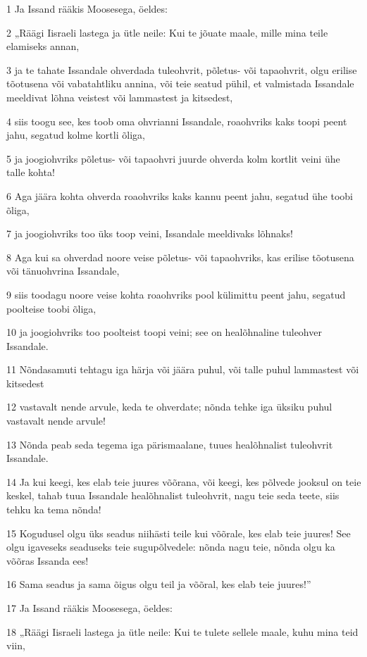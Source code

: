 \par 1 Ja Issand rääkis Moosesega, öeldes:
\par 2 „Räägi Iisraeli lastega ja ütle neile: Kui te jõuate maale, mille mina teile elamiseks annan,
\par 3 ja te tahate Issandale ohverdada tuleohvrit, põletus- või tapaohvrit, olgu erilise tõotusena või vabatahtliku annina, või teie seatud pühil, et valmistada Issandale meeldivat lõhna veistest või lammastest ja kitsedest,
\par 4 siis toogu see, kes toob oma ohvrianni Issandale, roaohvriks kaks toopi peent jahu, segatud kolme kortli õliga,
\par 5 ja joogiohvriks põletus- või tapaohvri juurde ohverda kolm kortlit veini ühe talle kohta!
\par 6 Aga jäära kohta ohverda roaohvriks kaks kannu peent jahu, segatud ühe toobi õliga,
\par 7 ja joogiohvriks too üks toop veini, Issandale meeldivaks lõhnaks!
\par 8 Aga kui sa ohverdad noore veise põletus- või tapaohvriks, kas erilise tõotusena või tänuohvrina Issandale,
\par 9 siis toodagu noore veise kohta roaohvriks pool külimittu peent jahu, segatud poolteise toobi õliga,
\par 10 ja joogiohvriks too poolteist toopi veini; see on healõhnaline tuleohver Issandale.
\par 11 Nõndasamuti tehtagu iga härja või jäära puhul, või talle puhul lammastest või kitsedest
\par 12 vastavalt nende arvule, keda te ohverdate; nõnda tehke iga üksiku puhul vastavalt nende arvule!
\par 13 Nõnda peab seda tegema iga pärismaalane, tuues healõhnalist tuleohvrit Issandale.
\par 14 Ja kui keegi, kes elab teie juures võõrana, või keegi, kes põlvede jooksul on teie keskel, tahab tuua Issandale healõhnalist tuleohvrit, nagu teie seda teete, siis tehku ka tema nõnda!
\par 15 Kogudusel olgu üks seadus niihästi teile kui võõrale, kes elab teie juures! See olgu igaveseks seaduseks teie sugupõlvedele: nõnda nagu teie, nõnda olgu ka võõras Issanda ees!
\par 16 Sama seadus ja sama õigus olgu teil ja võõral, kes elab teie juures!”
\par 17 Ja Issand rääkis Moosesega, öeldes:
\par 18 „Räägi Iisraeli lastega ja ütle neile: Kui te tulete sellele maale, kuhu mina teid viin,
